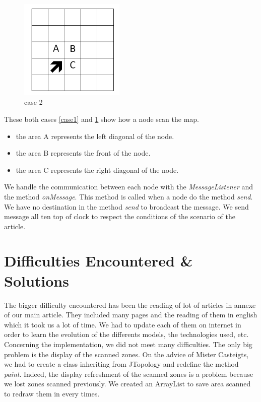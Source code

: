 \begin{figure}[!h]
\center
\includegraphics[width=5cm]{../images/grille_case_2.png}
\caption{\label{case2}case 2}
\end{figure}

These both cases \ref{case1} and \ref{case2} show how a node scan the map.

\begin{itemize}
\item the area A represents the left diagonal of the node.
\item the area B represents the front of the node.
\item the area C represents the right diagonal of the node.
\end{itemize}

We handle the communication between each node with the \textit{MessageListener} and the method \textit{onMessage}. This method is called when a node do the method \textit{send}. We have no destination in the method \textit{send} to broadcast the message. We send message all ten top of clock to respect the conditions of the scenario of the article.

\newpage

\section{Difficulties Encountered \& Solutions}

The bigger difficulty encountered has been the reading of lot of articles in annexe of our main article. They included many pages and the reading of them in english which it took us a lot of time. We had to update each of them on internet in order to learn the evolution of the differents models, the technologies used, etc.\\

Concerning the implementation, we did not meet many difficulties. The only big problem is the display of the scanned zones. On the advice of Mister Casteigts, we had to create a class inheriting from JTopology and redefine the method \textit{paint}. Indeed, the display refreshment of the scanned zones is a problem because we lost zones scanned previously. We created an ArrayList to save area scanned to redraw them in every times.